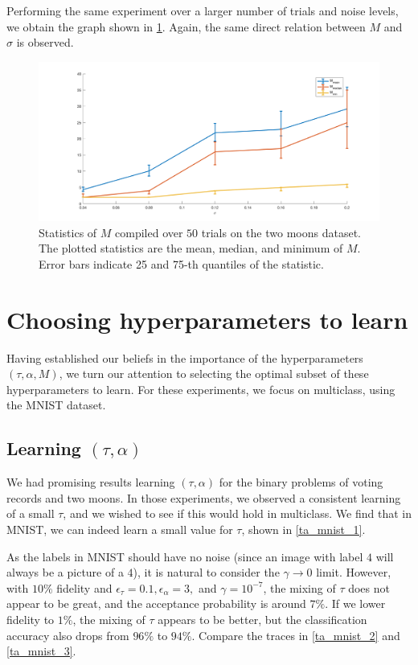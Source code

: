 \documentclass{siamart1116}
\begin{document}
        Performing the same experiment over a larger number of trials and noise levels, we obtain the graph shown in \cref{taM_M_moons_3}. Again, the same direct relation between $M$ and $\sigma$ is observed.

        \begin{figure}[!htb]
        \centering
        \caption{\label{taM_M_moons_3}Statistics of $M$ compiled over $50$ trials on the two moons dataset. The plotted statistics are the mean, median, and minimum of $M$. Error bars indicate 25 and 75-th quantiles of the statistic.}
        \includegraphics[width=0.8\linewidth]{M_observations/all_M_sigma.png}
        \end{figure}

\section{Choosing hyperparameters to learn}
    Having established our beliefs in the importance of the hyperparameters $(\tau, \alpha, M)$, we turn our attention to selecting the optimal subset of these hyperparameters to learn. For these experiments, we focus on multiclass, using the MNIST dataset.
    \subsection{Learning $(\tau, \alpha)$}
        We had promising results learning $(\tau, \alpha)$ for the binary problems of voting records and two moons. In those experiments, we observed a consistent learning of a small $\tau$, and we wished to see if this would hold in multiclass. We find that in MNIST, we can indeed learn a small value for $\tau$, shown in \cref{ta_mnist_1}.

        As the labels in MNIST should have no noise (since an image with label $4$ will always be a picture of a $4$), it is natural to consider the $\gamma \to 0$ limit. However, with $10\%$ fidelity and $\epsilon_\tau = 0.1, \epsilon_\alpha = 3,$ and $\gamma = 10^{-7}$, the mixing of $\tau$ does not appear to be great, and the acceptance probability is around $7\%$. If we lower fidelity to $1\%$, the mixing of $\tau$ appears to be better, but the classification accuracy also drops from $96\%$ to $94\%$. Compare the traces in \cref{ta_mnist_2} and \cref{ta_mnist_3}.
\end{document}
